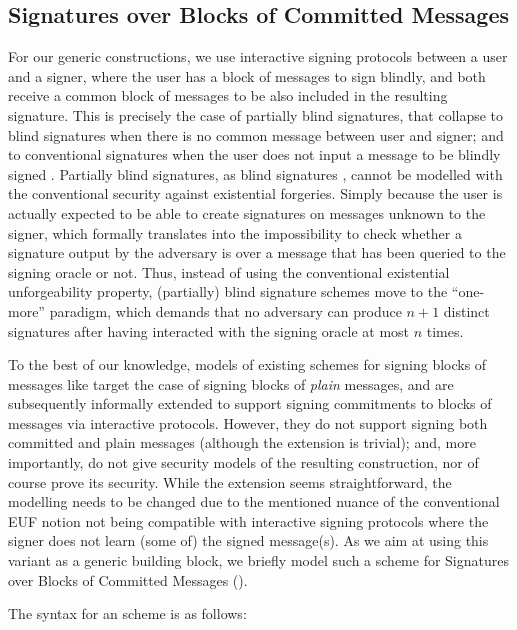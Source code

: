 \subsection{Signatures over Blocks of Committed Messages}
\label{sapp:sbcm}

For our generic constructions, we use interactive signing protocols between a
user and a signer, where the user has a block of messages to sign blindly, and
both receive a common block of messages to be also included in the resulting
signature. This is precisely the case of partially blind signatures, that
collapse to blind signatures when there is no common message between user
and signer; and to conventional signatures when the user does not input a
message to be blindly signed \cite{ao00}. Partially blind signatures, as
blind signatures \cite{ps96}, cannot be modelled with the conventional security
against existential forgeries. Simply because the user is actually expected to
be able to create signatures on messages unknown to the signer, which formally
translates into the impossibility to check whether a signature output by the
adversary is over a message that has been queried to the signing oracle or not.
Thus, instead of using the conventional existential unforgeability property,
(partially) blind signature schemes move to the ``one-more'' paradigm, which
demands that no adversary can produce $n+1$ distinct signatures after having
interacted with the signing oracle at most $n$ times.

To the best of our knowledge, models of existing schemes for signing blocks of
messages like \cite{cl02,asm06,ps16,cdl16b} target the case of signing blocks
of \emph{plain} messages, and are subsequently informally extended to support
signing commitments to blocks of messages via interactive protocols. However,
they do not support signing both committed and plain messages (although the
extension is trivial); and, more importantly, do not give security models of
the resulting construction, nor of course prove its security. While the
extension seems straightforward, the modelling needs to be changed due to the
mentioned nuance of the conventional EUF notion not being compatible with
interactive signing protocols where the signer does not learn (some of) the
signed message(s). As we aim at using this variant as a generic building block,
we briefly model such a scheme for Signatures over Blocks of Committed Messages
(\SBCM).

The syntax for an \SBCM scheme is as follows:

